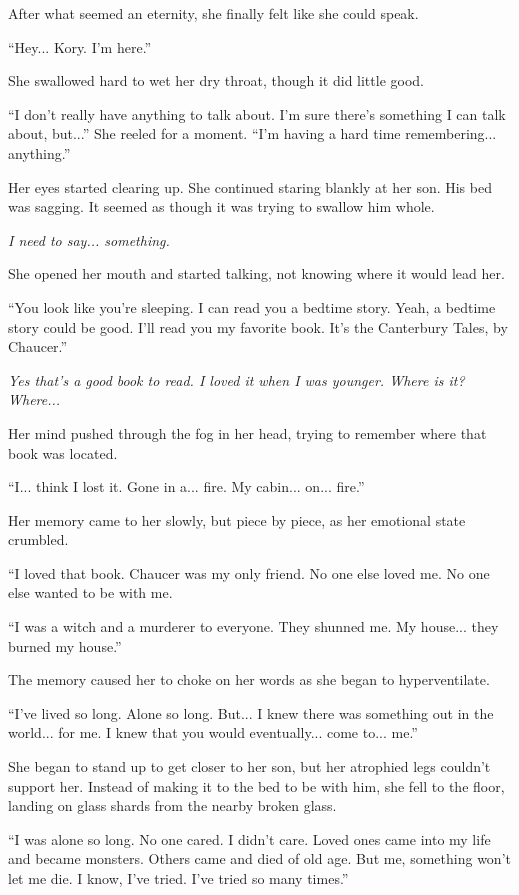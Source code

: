 After what seemed an eternity, she finally felt like she could speak.

``Hey... Kory. I'm here.''

She swallowed hard to wet her dry throat, though it did little good.

``I don't really have anything to talk about. I'm sure there's something I can talk about, but...'' She reeled for a moment. ``I'm having a hard time remembering... anything.''

Her eyes started clearing up. She continued staring blankly at her son. His bed was sagging. It seemed as though it was trying to swallow him whole.

\textit{I need to say... something.}

She opened her mouth and started talking, not knowing where it would lead her.

``You look like you're sleeping. I can read you a bedtime story. Yeah, a bedtime story could be good. I'll read you my favorite book. It's the Canterbury Tales, by Chaucer.''

\textit{Yes that's a good book to read. I loved it when I was younger. Where is it? Where...}

Her mind pushed through the fog in her head, trying to remember where that book was located.

``I... think I lost it. Gone in a... fire. My cabin... on... fire.''

Her memory came to her slowly, but piece by piece, as her emotional state crumbled.

``I loved that book. Chaucer was my only friend. No one else loved me. No one else wanted to be with me.

``I was a witch and a murderer to everyone. They shunned me. My house... they burned my house.''

The memory caused her to choke on her words as she began to hyperventilate.

``I've lived so long. Alone so long. But... I knew there was something out in the world... for me. I knew that you would eventually... come to... me.''

She began to stand up to get closer to her son, but her atrophied legs couldn't support her. Instead of making it to the bed to be with him, she fell to the floor, landing on glass shards from the nearby broken glass.

``I was alone so long. No one cared. I didn't care. Loved ones came into my life and became monsters. Others came and died of old age. But me, something won't let me die. I know, I've tried. I've tried so many times.''

